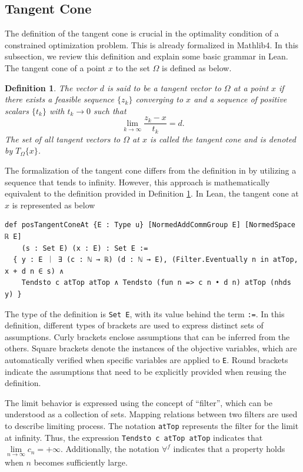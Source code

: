 \documentclass[sn-mathphys]{JORSC-jnl}%
\theoremstyle{thmstyleone}%
\theoremstyle{thmstylethree}%
\newtheorem{definition}{Definition}%
\newcommand{\lean}[1]{\lstinline[language=lean, mathescape=true]{#1}}
\begin{document}
\subsection{Tangent Cone}
The definition of the tangent cone is crucial in the optimality condition of a constrained optimization problem. This is already formalized in Mathlib4. In this subsection, we review this definition and explain some basic grammar in Lean. The tangent cone of a point $x$ to the set $\Omega$ is defined as below.
\begin{definition}\label{def: tangent cone}
    The vector \( d \) is said to be a tangent vector to \( \Omega \) at a point \( x \) if there exists a feasible sequence \( \{ z_k \} \) converging to \( x \) and a sequence of positive scalars \( \{ t_k \} \) with \( t_k \to 0 \) such that
    \[\lim_{k\to\infty}\frac{z_k-x}{t_k} = d.\]
    The set of all tangent vectors to $\Omega$ at $x$ is called the tangent cone and is denoted by $T_\Omega\{x\}$.
\end{definition}

The formalization of the tangent cone differs from the definition in \cite{nocedal1999numerical} by utilizing a sequence that tends to infinity. However, this approach is mathematically equivalent to the definition provided in Definition \ref{def: tangent cone}. In Lean, the tangent cone at $x$ is represented as below
\begin{lstlisting}
def posTangentConeAt {E : Type u} [NormedAddCommGroup E] [NormedSpace ℝ E]  
    (s : Set E) (x : E) : Set E :=
  { y : E ｜ ∃ (c : ℕ → ℝ) (d : ℕ → E), (Filter.Eventually n in atTop, x + d n ∈ s) ∧
    Tendsto c atTop atTop ∧ Tendsto (fun n => c n • d n) atTop (nhds y) }
\end{lstlisting}
The type of the definition is \lean{Set E}, with its value behind the term \lean{:=}. In this definition, different types of brackets are used to express distinct sets of assumptions. Curly brackets enclose assumptions that can be inferred from the others. Square brackets denote the instances of the objective variables, which are automatically verified when specific variables are applied to \lean{E}. Round brackets indicate the assumptions that need to be explicitly provided when reusing the definition.

The limit behavior is expressed using the concept of ``filter”, which can be understood as a collection of sets. Mapping relations between two filters are used to describe limiting process. The notation \lean{atTop} represents the filter for the limit at infinity. Thus, the expression \lean{Tendsto c atTop atTop} indicates that $\lim\limits_{n \to \infty} c_n = +\infty$. Additionally, the notation $\forall^f$ indicates that a property holds when $n$ becomes sufficiently large.
\end{document}
